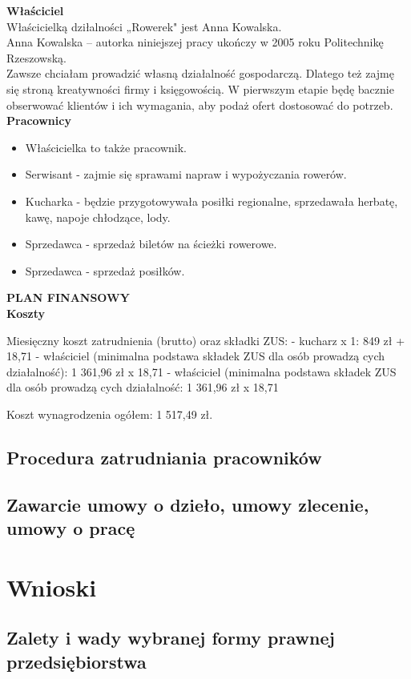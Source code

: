 \documentclass{sprawozdanie-agh}
\begin{document}
		\textbf{Właściciel}\\
		Właścicielką dziłalności „Rowerek" jest Anna Kowalska.\\
		Anna Kowalska – autorka niniejszej pracy ukończy w 2005 roku Politechnikę Rzeszowską. \\
		Zawsze chciałam prowadzić własną działalność gospodarczą. Dlatego też zajmę się stroną kreatywności firmy i księgowością. W pierwszym etapie będę bacznie obserwować klientów i ich wymagania, aby podaż ofert dostosować do potrzeb.\\
		\textbf{Pracownicy}
		\begin{itemize}
		\item Właścicielka to także pracownik.
		\item Serwisant - zajmie się sprawami napraw i wypożyczania rowerów.
		\item Kucharka - będzie przygotowywała posiłki regionalne, sprzedawała herbatę, kawę, napoje chłodzące, lody.
		\item Sprzedawca - sprzedaż biletów na ścieżki rowerowe.
		\item Sprzedawca - sprzedaż posiłków.
		\end{itemize}
		\textbf{PLAN FINANSOWY}\\
		\textbf{Koszty}
		
		Miesięczny koszt zatrudnienia (brutto) oraz składki ZUS: 
		- kucharz x 1:
		849 zł + 18,71%
		-	właściciel (minimalna podstawa składek ZUS dla osób prowadzą
		cych działalność):
		1 361,96 zł x 18,71%
		-	właściciel (minimalna podstawa składek ZUS dla osób prowadzą
		cych działalność:
		1 361,96 zł x 18,71%
		
		Koszt wynagrodzenia ogółem:		  1 517,49 zł.
		
		\subsection{Procedura zatrudniania pracowników}
		\subsection{Zawarcie umowy o dzieło, umowy zlecenie, umowy o pracę}

	\section{Wnioski} 

		\subsection{Zalety i wady wybranej formy prawnej przedsiębiorstwa}
\end{document}
